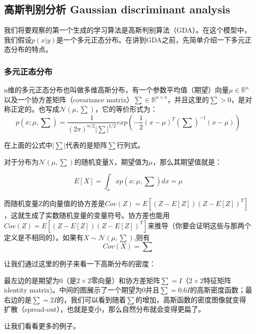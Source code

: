 \documentclass[UTF8]{ctexart}
\begin{document}
\subsection{高斯判别分析 Gaussian discriminant analysis}


我们将要观察的第一个生成的学习算法是高斯判别算法（GDA）。在这个模型中，我们假设$p(x|y)$是一个多元正态分布。在讲到GDA之前，先简单介绍一下多元正态分布的特点。


\subsubsection{多元正态分布}

n维的多元正态分布也叫做多维高斯分布，有一个参数平均值（期望）向量$\mu \in \mathbb{R}^{n}$以及一个协方差矩阵（covariance matrix）$\sum \in \mathbb{R}^{n\times n}$，并且这里的$\sum > 0 $，是对称正定的。也写成$\mathcal{N} (\mu,\sum)$，它的等价形式为：\[ p(x;\mu,\sum) = \frac{1}{(2\pi)^{n/2}|\sum|^{1/2}}exp(-\frac{1}{2}(x-\mu)^{T} (\sum)^{-1}(x-\mu)) \]

在上面的公式中$|\sum|$代表的是矩阵$\sum$行列式。

对于分布为$\mathcal{N} (\mu,\sum)$的随机变量X，期望值为$\mu$，那么其期望值就是：

\[ E[X] = \int_x x p(x;\mu,\sum)dx = \mu \]

而随机变量Z的向量值的协方差是$Cov(Z)= E[(Z-E[Z])(Z-E[Z])^{T}]$，这就生成了实数随机变量的变量符号。协方差也能用$Cov(Z)= E[(Z-E[Z])(Z-E[Z])^{T}]$来推导（你要会证明这些与那两个定义是不相同的）。如果有$X \sim \mathcal{N}(\mu,\sum)$,则有
\[Cov(X)=\sum\]

让我们通过这里的例子来看一下高斯分布的密度：

\begin{figure}[htb]        
\end{figure}

最左边的是期望为0（是$2 \times 2 $零向量）和协方差矩阵$\sum = I$（$2\times 2$特征矩阵 identity matrix)。中间的图展示了一个期望为0并且$\sum = 0.6I$的高斯密度函数；最右边的是$\sum = 2I$的，我们可以看到随着$\sum$的增加，高斯函数的密度图像就变得扩散（spread-out），也就是变小，那么自然分布就会变得更扁了。

让我们看看更多的例子。

\begin{figure}[htb]        
\end{figure}
\end{document}
